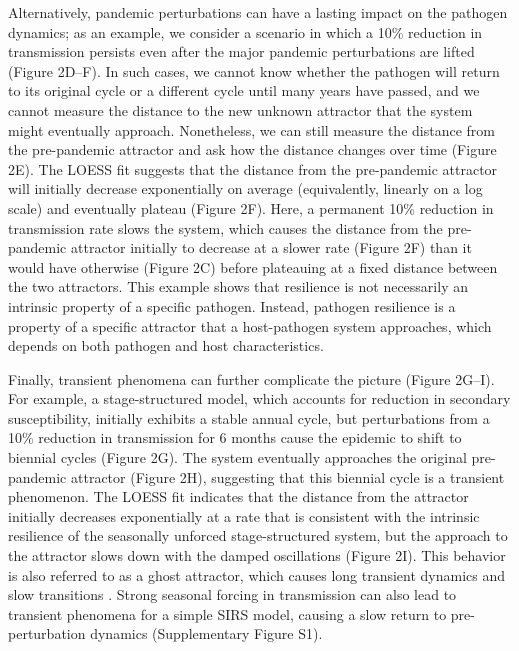 \documentclass[12pt]{article}
\begin{document}
Alternatively, pandemic perturbations can have a lasting impact on the pathogen dynamics; 
as an example, we consider a scenario in which a 10\% reduction in transmission persists even after the major pandemic perturbations are lifted (Figure 2D--F).
In such cases, we cannot know whether the pathogen will return to its original cycle or a different cycle until many years have passed, and we cannot measure the distance to the new unknown attractor that the system might eventually approach.
Nonetheless, we can still measure the distance from the pre-pandemic attractor and ask how the distance changes over time (Figure 2E).
The LOESS fit suggests that the distance from the pre-pandemic attractor will initially decrease exponentially on average (equivalently, linearly on a log scale) and eventually plateau (Figure 2F).
Here, a permanent 10\% reduction in transmission rate slows the system, which causes the distance from the pre-pandemic attractor initially to decrease at a slower rate (Figure 2F) than it would have otherwise (Figure 2C) before plateauing at a fixed distance between the two attractors.
This example shows that resilience is not necessarily an intrinsic property of a specific pathogen.
Instead, pathogen resilience is a property of a specific attractor that a host-pathogen system approaches, which depends on both pathogen and host characteristics.

Finally, transient phenomena can further complicate the picture (Figure 2G--I).
For example, a stage-structured model, which accounts for reduction in secondary susceptibility, initially exhibits a stable annual cycle, but perturbations from a 10\% reduction in transmission for 6 months cause the epidemic to shift to biennial cycles (Figure 2G).
The system eventually approaches the original pre-pandemic attractor (Figure 2H), suggesting that this biennial cycle is a transient phenomenon.
The LOESS fit indicates that the distance from the attractor initially decreases exponentially at a rate that is consistent with the intrinsic resilience of the seasonally unforced stage-structured system, but the approach to the attractor slows down with the damped oscillations (Figure 2I).
This behavior is also referred to as a ghost attractor, which causes long transient dynamics and slow transitions \citep{hastings2018transient}.
Strong seasonal forcing in transmission can also lead to transient phenomena for a simple SIRS model, causing a slow return to pre-perturbation dynamics (Supplementary Figure S1).
\end{document}

